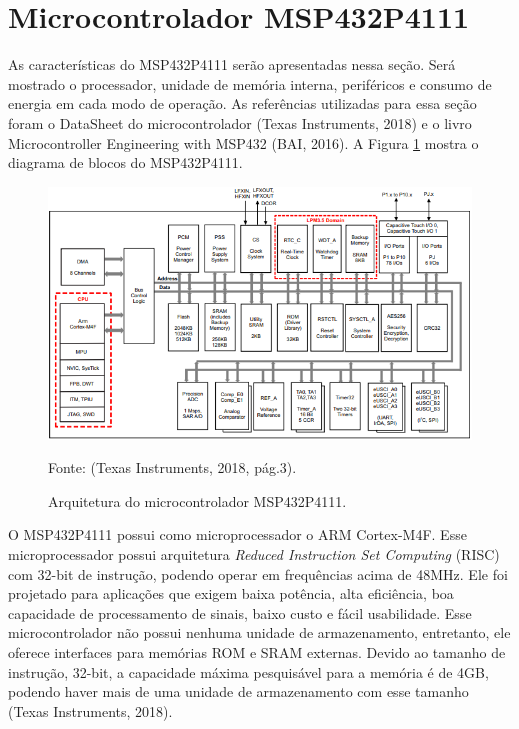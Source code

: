 \section{Microcontrolador MSP432P4111}

As características do MSP432P4111 serão apresentadas nessa seção. Será mostrado o processador, unidade de memória interna, periféricos e consumo de energia em cada modo de operação. As referências utilizadas para essa seção foram o DataSheet do microcontrolador (Texas Instruments, 2018) e o livro Microcontroller Engineering with MSP432 (BAI, 2016). A Figura \ref{fig19} mostra o diagrama de blocos do MSP432P4111.

\begin{figure}[h]
	\centering
    \caption{Arquitetura do microcontrolador MSP432P4111.}
    
	\includegraphics[keepaspectratio=true,scale=0.8]{figuras/msp432.PNG}
	
	Fonte: (Texas Instruments, 2018, pág.3).
	\label{fig19}
\end{figure}

O MSP432P4111 possui como microprocessador o ARM Cortex-M4F. Esse microprocessador possui arquitetura \textit{Reduced Instruction Set Computing} (RISC) com  32-bit de instrução, podendo operar em frequências acima de 48MHz. Ele foi projetado para aplicações que exigem baixa potência, alta eficiência, boa capacidade de processamento de sinais, baixo custo e fácil usabilidade. Esse microcontrolador não possui nenhuma unidade de armazenamento, entretanto, ele oferece interfaces para memórias ROM e SRAM externas. Devido ao tamanho de instrução, 32-bit, a capacidade máxima pesquisável para a memória é de 4GB, podendo haver mais de uma unidade de armazenamento com esse tamanho (Texas Instruments, 2018).

